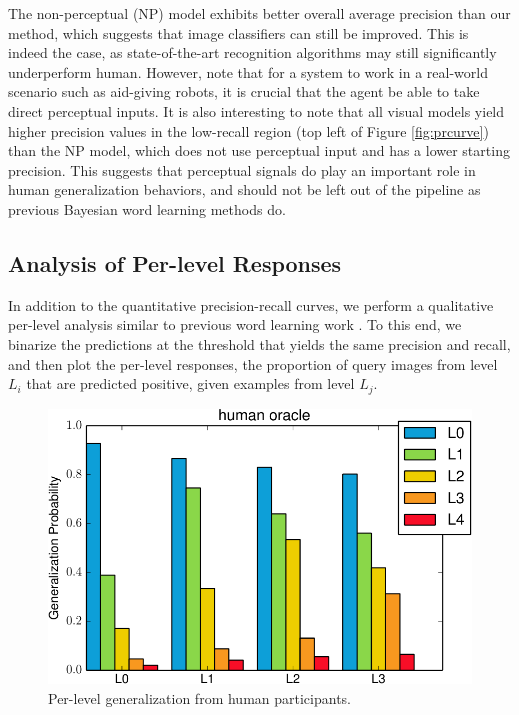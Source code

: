 The non-perceptual (NP) model exhibits better overall average precision than our method, which suggests that image classifiers can still be improved. This is indeed the case, as state-of-the-art recognition algorithms may still significantly underperform human. However, note that for a system to work in a real-world scenario such as aid-giving robots, it is crucial that the agent be able to take direct perceptual inputs. It is also interesting to note that all visual models yield higher precision values in the low-recall region (top left of Figure \ref{fig:prcurve}) than the NP model, which does not use perceptual input and has a lower starting precision. This suggests that perceptual signals do play an important role in human generalization behaviors, and should not be left out of the pipeline as previous Bayesian word learning methods do.

\subsection{Analysis of Per-level Responses}\label{subsec:bars}

In addition to the quantitative precision-recall curves, we perform a qualitative per-level analysis similar to previous word learning work \cite{abbottconstructing}. To this end, we binarize the predictions at the threshold that yields the same precision and recall, and then plot the per-level responses, \ie the proportion of query images from level $L_i$ that are predicted positive, given examples from level $L_j$.

\begin{figure}
    \centering
    \includegraphics[width=0.6\linewidth]{figs/vcl/per_level_response_human.pdf}
    \caption{Per-level generalization from human participants.}\label{fig:humanbars}
\end{figure}

